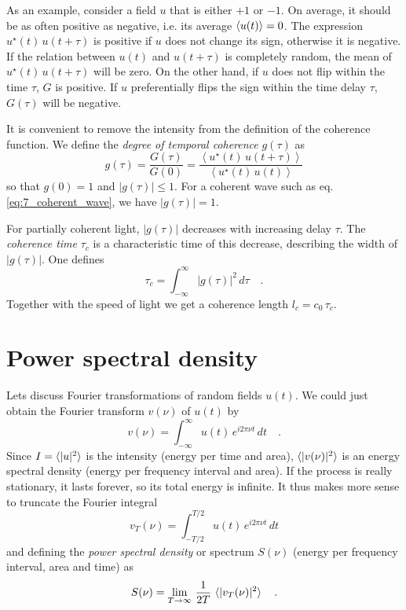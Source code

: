 As an example, consider a field $u$ that is either $+1$ or $-1$. On average, it should be as often positive as negative, i.e. its average $\braket{u(t)} = 0$. The expression $u^\star(t) \, u(t + \tau)$ is positive if $u$ does not change its sign, otherwise it is negative. If the relation between $u(t)$ and $u(t+\tau)$ is completely random, the mean of $u^\star(t) \, u(t + \tau)$ will be zero. On the other hand, if $u$ does not flip within the time $\tau$, $G$ is positive. If $u$ preferentially flips the sign within the time delay $\tau$, $G(\tau)$ will be negative.

It is convenient to remove the intensity from the definition of the coherence function. We define the \emph{degree of temporal coherence} $g(\tau)$ as
\begin{equation}
    g(\tau) = \frac{G(\tau)}{G(0)}
    = \frac{\left< u^\star(t) \, u(t + \tau) \right>}{\left< u^\star(t) \, u(t) \right>}
\end{equation}
so that $g(0) = 1$ and $|g(\tau)| \le 1$. For a coherent wave such as eq.  \ref{eq:7_coherent_wave}, we have  $|g(\tau)| = 1$.

For partially coherent light, $|g(\tau)|$ decreases with increasing delay $\tau$. The \emph{coherence time} $\tau_c$ is a characteristic time of this decrease, describing the width of $|g(\tau)|$. One defines 
\begin{equation}
    \tau_c = \int_{-\infty}^{\infty} |g(\tau)|^2 \, d\tau \quad .
\end{equation}
Together with the speed of light we get a coherence length $l_c = c_0 \, \tau_c$.




\section{Power spectral density}

Lets discuss Fourier transformations of random fields $u(t)$. We could just obtain the Fourier transform $v(\nu)$ of $u(t)$ by
\begin{equation}
    v(\nu) = \int_{-\infty}^\infty u(t) \, e^{i 2 \pi \nu t} \, dt \quad . \label{eq:7_FT_full}
\end{equation}
Since $I = \braket{|u|^2}$ is the intensity (energy per time and area), $\braket{|v(\nu)|^2}$ is an energy spectral density (energy per frequency interval and area). If the process is really stationary, it lasts forever, so its total energy is infinite. It thus makes more sense to truncate the Fourier integral
\begin{equation}
    v_T(\nu) = \int_{-T/2}^{T/2} u(t) \, e^{i 2 \pi \nu t} \, dt
\end{equation}
and defining the \emph{power spectral density} or spectrum  $S(\nu)$ (energy per frequency interval, area and time) as
\begin{equation}
    S(\nu) = \lim_{T \rightarrow \infty} \, \frac{1}{2T} \, 
    \braket{|v_T(\nu)|^2} \quad .
\end{equation}

